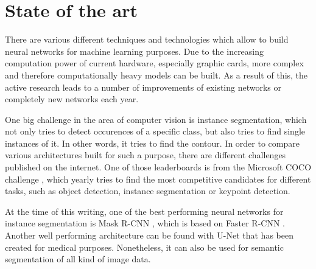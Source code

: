 
\chapter{State of the art}\label{chp:state_of_the_art}

There are various different techniques and technologies which allow to build neural networks for machine learning purposes. Due to the increasing computation power of current hardware, especially graphic cards, more complex and therefore computationally heavy models can be built. As a result of this, the active research leads to a number of improvements of existing networks or completely new networks each year.

One big challenge in the area of computer vision is instance segmentation, which not only tries to detect occurences of a specific class, but also tries to find single instances of it. In other words, it tries to find the contour. In order to compare various architectures built for such a purpose, there are different challenges published on the internet. One of those leaderboards is from the Microsoft COCO challenge \cite{Lin.20150221}, which yearly tries to find the most competitive candidates for different tasks, such as object detection, instance segmentation or keypoint detection.

At the time of this writing, one of the best performing neural networks for instance segmentation is Mask R-CNN \cite{He.20170405}, which is based on Faster R-CNN \cite{Ren.20160106}.
Another well performing architecture can be found with U-Net \cite{Ronneberger.20150518b} that has been created for medical purposes. Nonetheless, it can also be used for semantic segmentation of all kind of image data.